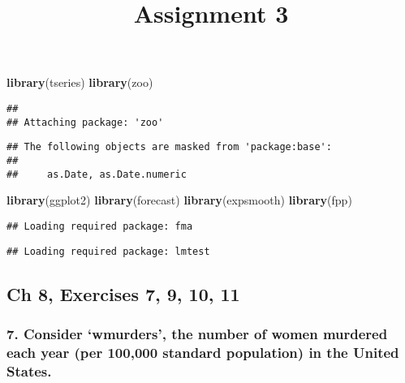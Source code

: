 \documentclass[]{article}
\title{Assignment 3}
\author{}
\date{}
\newenvironment{Shaded}{\begin{snugshade}}{\end{snugshade}}
\newcommand{\KeywordTok}[1]{\textcolor[rgb]{0.13,0.29,0.53}{\textbf{#1}}}
\newcommand{\NormalTok}[1]{#1}
\begin{document}
\maketitle

\begin{Shaded}
\begin{Highlighting}[]
\KeywordTok{library}\NormalTok{(tseries)}
\KeywordTok{library}\NormalTok{(zoo)}
\end{Highlighting}
\end{Shaded}

\begin{verbatim}
## 
## Attaching package: 'zoo'
\end{verbatim}

\begin{verbatim}
## The following objects are masked from 'package:base':
## 
##     as.Date, as.Date.numeric
\end{verbatim}

\begin{Shaded}
\begin{Highlighting}[]
\KeywordTok{library}\NormalTok{(ggplot2)}
\KeywordTok{library}\NormalTok{(forecast)}
\KeywordTok{library}\NormalTok{(expsmooth)}
\KeywordTok{library}\NormalTok{(fpp)}
\end{Highlighting}
\end{Shaded}

\begin{verbatim}
## Loading required package: fma
\end{verbatim}

\begin{verbatim}
## Loading required package: lmtest
\end{verbatim}

\subsection{Ch 8, Exercises 7, 9, 10,
11}\label{ch-8-exercises-7-9-10-11}

\subsubsection{\texorpdfstring{7. Consider `wmurders', the number of
women murdered each year (per 100,000 standard population) in the United
States.}{7. Consider wmurders, the number of women murdered each year (per 100,000 standard population) in the United States.}}\label{consider-wmurders-the-number-of-women-murdered-each-year-per-100000-standard-population-in-the-united-states.}
\end{document}
